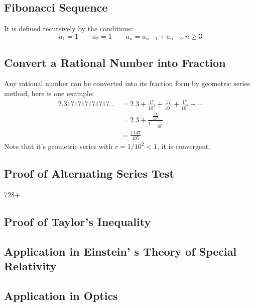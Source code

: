 \documentclass[10pt,a4paper,oneside]{article}
\begin{document}
\subsection{Fibonacci Sequence}
It is defined recursively by the conditions:
\[
a_1 = 1 \qquad a_2 =1 \qquad a_n = a_{n-1} + a_{n-2}, n\geq3
\]

\subsection{Convert a Rational Number into Fraction}
Any rational number can be converted into its fraction form by geometric series method, here is one example:
\begin{align*}
2.3171717171717\dots &= 2.3 + \frac{17}{10^3} + \frac{17}{10^5} + \frac{17}{10^7} +\cdots\\
&=2.3 + \frac{\frac{17}{10^3}}{1-\frac{1}{10^2}}\\
&= \frac{1147}{495}
\end{align*}
Note that it's geometric series with $r=1/10^2<1$, it is convergent.

\subsection{Proof of Alternating Series Test}
728+

\subsection{Proof of Taylor's Inequality}

\subsection{Application in Einstein' s Theory of Special Relativity}

\subsection{Application in Optics}
\end{document}
